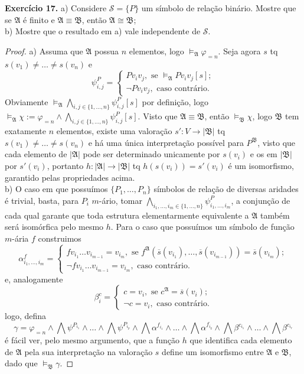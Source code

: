 \documentclass[11pt]{article}
\newcommand{\mc}[1]{\mathcal{#1}}
\newcommand{\mf}[1]{\mathfrak{#1}}
\begin{document}
\begin{shaded}
\textbf{Exercício 17.} a) Considere $\mc{S}=\{P\}$ um símbolo de relação binário. Mostre que se $\mf{A}$ é finito e  $\mf{A}\equiv\mf{B}$, então $\mf{A}\cong\mf{B}$;\\
b) Mostre que o resultado em a) vale independente de $\mc{S}$.
\end{shaded}

\begin{proof}
    a) Assuma que $\mf{A}$ possua $n$ elementos, logo $\vDash_\mf{A}\varphi_{=n}$. Seja agora $s$ tq $s(v_1)\neq\dots\neq s(v_n)$ e
    $$\psi_{i,j}^P=\begin{cases}Pv_iv_j,\text{ se }\vDash_\mf{A}Pv_iv_j[s];\\\neg Pv_iv_j,\text{ caso contrário}.\end{cases}$$
    Obviamente $\vDash_\mf{A}\bigwedge_{i,j\in\{1,\dots,n\}}{\psi_{i,j}^P}[s]$ por definição, logo $\vDash_\mf{A}\chi:=\varphi_{=n}\wedge\bigwedge_{i,j\in\{1,\dots,n\}}\psi_{i,j}^P[s]$. Visto que $\mf{A}\equiv\mf{B}$, então $\vDash_\mf{B}\chi$, logo $\mf{B}$ tem exatamente $n$ elementos, existe uma valoração $s':V\to|\mf{B}|$ tq $s(v_1)\neq\dots\neq s(v_n)$ e há uma única interpretação possível para $P^\mf{B}$, visto que cada elemento de $|\mf{A}|$ pode ser determinado unicamente por $s(v_i)$ e os em $|\mf{B}|$ por $s'(v_i)$, portanto $h:|\mf{A}|\to|\mf{B}|$ tq $h(s(v_i))=s'(v_i)$ é um isomorfismo, garantido pelas propriedades acima.\\
    b) O caso em que possuímos $\{P_1,\dots,P_n\}$ símbolos de relação de diversas aridades é trivial, basta, para $P_i$ $m$-ário, tomar $\bigwedge_{i_1,\dots,i_m\in\{1,\dots,n\}}\psi_{i_1,\dots,i_m}^P$, a conjunção de cada qual garante que toda estrutura elementarmente equivalente a $\mf{A}$ também será isomórfica pelo mesmo $h$. Para o caso que possuímos um símbolo de função $m$-ária $f$ construimos
    $$\alpha^f_{i_1,\dots,i_m}=\begin{cases}
        fv_{i_1}\dots v_{i_{m-1}}=v_{i_m},\text{ se }f^\mf{A}(\overline{s}(v_{i_1}),\dots,\overline{s}(v_{i_{m-1}}))=\overline{s}(v_{i_m});\\
        \neg fv_{i_1}\dots v_{i_{m-1}}=v_{i_m},\text{ caso contrário}.
    \end{cases}$$
    e, analogamente
    $$\beta^c_{i}=\begin{cases}
        c=v_i,\text{ se }c^\mf{A}=\overline{s}(v_i);\\
        \neg c=v_i,\text{ caso contrário}.
    \end{cases}$$
    logo, defina
    $$\gamma=\varphi_{=n}\wedge\bigwedge\psi^{P_{i_1}}\wedge\dots\wedge\bigwedge\psi^{P_{i_p}}\wedge\bigwedge\alpha^{f_{i_1}}\wedge\dots\wedge\bigwedge\alpha^{f_{i_q}}\wedge\bigwedge\beta^{c_{i_1}}\wedge\dots\wedge\bigwedge\beta^{c_{i_r}}$$
    é fácil ver, pelo mesmo argumento, que a função $h$ que identifica cada elemento de $\mf{A}$ pela sua interpretação na valoração $s$ define um isomorfismo entre $\mf{A}$ e $\mf{B}$, dado que $\vDash_\mf{B}\gamma$.
\end{proof}
\end{document}
